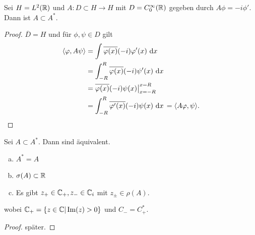 \documentclass{mycourse}
\begin{document}
\begin{ex*}
Sei $H= L^2(\mathbb{R})$ und $A: D \subset H \to H$ mit $D=C_0^\infty(\mathbb{R})$ gegeben durch $A\phi = -i \phi'$. Dann ist $A\subset A^*$.
\end{ex*}
\begin{proof}
$\overline{D}=H$ und für $\phi, \psi \in D$ gilt
\begin{align*}
\langle \varphi, A\psi\rangle &= \int \overline{\varphi(x)} (-i) \varphi'(x) \, \,\mathrm{d}x\, \\
&= \int_{-R}^R \overline{\varphi(x)} (-i) \psi'(x) \, \,\mathrm{d}x\, \\
&= \overline{\varphi(x)} (-i) \psi(x)\big|_{x=-R}^{x=R} \\
&= \int_{-R}^R \overline{\varphi'(x)} (-i) \psi (x) \, \,\mathrm{d}x\,= \langle A\varphi, \psi\rangle.
\end{align*}
\end{proof}

\begin{st}
Sei $A\subset A^*$. Dann sind äquivalent.
\begin{enumerate}[a)]
\item $A^*=A$
\item $\sigma(A) \subset \mathbb{R}$
\item Es gibt $z_+ \in \mathbb{C}_+, z_- \in \mathbb{C}_i$ mit $z_\pm \in \rho(A)$.
\end{enumerate}
wobei $\mathbb{C}_+=\{z\in \mathbb{C}| \operatorname{Im}(z) >0\}$ und $C_-= C^*_+$.
\end{st}
\begin{proof}
später.
\end{proof}
\end{document}
